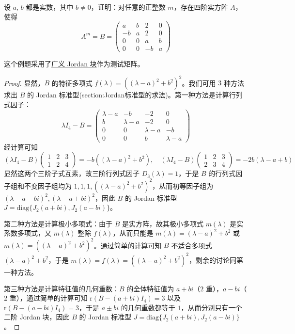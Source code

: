\documentclass[../../main.tex]{subfiles}
\begin{document}
\begin{example}
设 $a$, $b$ 都是实数，其中 $b\neq 0$，证明：对任意的正整数 $m$，存在四阶实方阵 $A$，使得
\[
A^m = B = 
\begin{pmatrix}
a & b & 2 & 0 \\
-b & a & 2 & 0 \\
0 & 0 & a & b \\
0 & 0 & -b & a
\end{pmatrix}
\]
\end{example}
\begin{remark}
这个例题采用了\hyperref[proposition:广义Jordan标准型]{广义 Jordan 块}作为测试矩阵。
\end{remark}
\begin{proof}
显然，$B$ 的特征多项式 $f(\lambda) = ((\lambda - a)^2 + b^2)^2$。我们可用 $3$ 种方法求出 $B$ 的 Jordan 标准型(section:Jordan标准型的求法)。第一种方法是计算行列式因子：
\[
\lambda I_4 - B = 
\begin{pmatrix}
\lambda - a & -b & -2 & 0 \\
b & \lambda - a & -2 & 0 \\
0 & 0 & \lambda - a & -b \\
0 & 0 & b & \lambda - a
\end{pmatrix}
\]
经计算可知
\[
(\lambda I_4 - B)\begin{pmatrix}1&2&3\\1&2&4\end{pmatrix} = -b((\lambda - a)^2 + b^2), \quad (\lambda I_4 - B)\begin{pmatrix}1&2&3\\2&3&4\end{pmatrix} = -2b(\lambda - a + b)
\]
显然这两个三阶子式互素，故三阶行列式因子 $D_3(\lambda) = 1$，于是 $B$ 的行列式因子组和不变因子组均为 $1,1,1,((\lambda - a)^2 + b^2)^2$，从而初等因子组为 $(\lambda - a - bi)^2,(\lambda - a + bi)^2$，因此 $B$ 的 Jordan 标准型 $J = \mathrm{diag}\{J_2(a + bi),J_2(a - bi)\}$。

第二种方法是计算极小多项式：由于 $B$ 是实方阵，故其极小多项式 $m(\lambda)$ 是实系数多项式，又 $m(\lambda)$ 整除 $f(\lambda)$，从而只能是 $m(\lambda) = (\lambda - a)^2 + b^2$ 或 $m(\lambda) = ((\lambda - a)^2 + b^2)^2$。通过简单的计算可知 $B$ 不适合多项式 $(\lambda - a)^2 + b^2$，于是 $m(\lambda) = f(\lambda) = ((\lambda - a)^2 + b^2)^2$，剩余的讨论同第一种方法。

第三种方法是计算特征值的几何重数：$B$ 的全体特征值为 $a + bi$（$2$ 重），$a - bi$（$2$ 重），通过简单的计算可知 $\mathrm{r}(B - (a + bi)I_4) = 3$ 以及 $\mathrm{r}(B - (a - bi)I_4) = 3$，于是 $a\pm bi$ 的几何重数都等于 $1$，从而分别只有一个二阶 Jordan 块，因此 $B$ 的 Jordan 标准型 $J = \mathrm{diag}\{J_2(a + bi),J_2(a - bi)\}$。


\end{proof}
\end{document}
